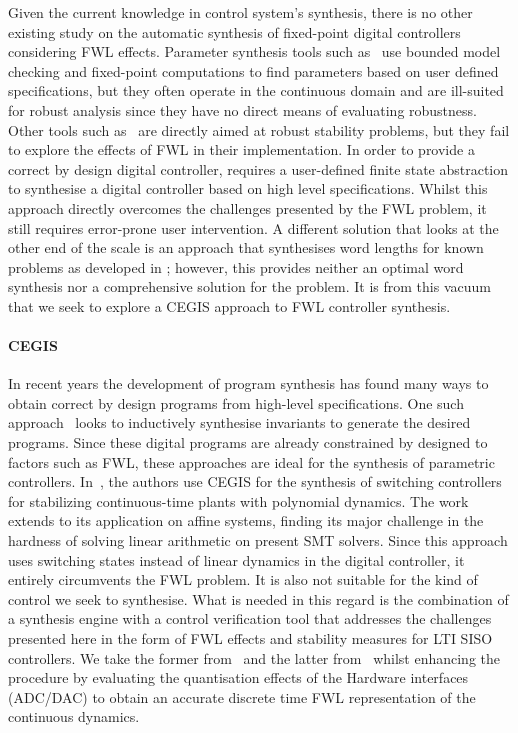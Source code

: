 \documentclass{sig-alternate-05-2015}
\begin{document}
Given the current knowledge in control system's synthesis, there is no other
existing study on the automatic synthesis of fixed-point digital controllers
considering FWL effects.  Parameter synthesis tools such
as~\cite{cimatti2013parameter} use bounded model checking and fixed-point
computations to find parameters based on user defined specifications, but
they often operate in the continuous domain and are ill-suited for robust
analysis since they have no direct means of evaluating robustness.  Other
tools such as~\cite{economakos2016automated} are directly aimed at robust
stability problems, but they fail to explore the effects of FWL in their
implementation.  In order to provide a correct by design digital controller,
\cite{alur2016compositional} requires a user-defined finite state
abstraction to synthesise a digital controller based on high level
specifications.  Whilst this approach directly overcomes the challenges
presented by the FWL problem, it still requires error-prone user
intervention.  A different solution that looks at the other end of the scale
is an approach that synthesises word lengths for known problems as developed
in \cite{jha2013swati}; however, this provides neither an optimal word
synthesis nor a comprehensive solution for the problem.  It is from this
vacuum that we seek to explore a CEGIS approach to FWL controller synthesis.

\paragraph{CEGIS}

In recent years the development of program synthesis has found many ways to
obtain correct by design programs from high-level specifications.  One such
approach~\cite{itzhaky2010simple} looks to inductively synthesise invariants
to generate the desired programs.  Since these digital programs are already
constrained by designed to factors such as FWL, these approaches are ideal
for the synthesis of parametric controllers. 
In~\cite{DBLP:conf/cdc/RavanbakhshS15}, the authors use CEGIS for the
synthesis of switching controllers for stabilizing continuous-time plants
with polynomial dynamics.  The work extends to its application on affine
systems, finding its major challenge in the hardness of solving linear
arithmetic on present SMT solvers.  Since this approach uses switching
states instead of linear dynamics in the digital controller, it entirely
circumvents the FWL problem.  It is also not suitable for the kind of
control we seek to synthesise.  What is needed in this regard is the
combination of a synthesis engine with a control verification tool that
addresses the challenges presented here in the form of FWL effects and
stability measures for LTI SISO controllers.  We take the former
from~\cite{DBLP:conf/lpar/DavidKL15} and the latter from~\cite{daes20161}
whilst enhancing the procedure by evaluating the quantisation effects of
the Hardware interfaces (ADC/DAC) to obtain an accurate discrete time FWL
representation of the continuous dynamics.
 
\end{document}
